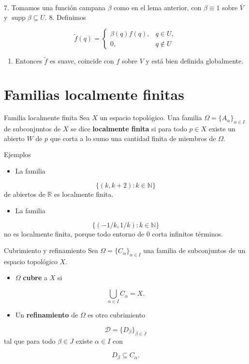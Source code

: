 \begin{bookproof}{}
7. Tomamos una función campana $\beta$ como en el lema anterior, con $\beta\equiv 1$ sobre $\overline V$ y $\operatorname{supp}\beta\subseteq U$. 8. Definimos

\[
\widetilde f(q)=\begin{cases}\beta(q)f(q),& q\in U,\\0,& q\notin U\end{cases}
\]
\begin{enumerate}[start=9]
\item Entonces $\widetilde f$ es suave, coincide con $f$ sobre $V$ y está bien definida globalmente.
\end{enumerate}
\bookqed
\end{bookproof}
\section{Familias localmente finitas}
\begin{bookdefinition}{Familia localmente finita}
Sea $X$ un espacio topológico. Una familia $\Omega=\{A_\alpha\}_{\alpha\in I}$ de subconjuntos de $X$ se dice \textbf{localmente finita} si para todo $p\in X$ existe un abierto $W$ de $p$ que corta a lo sumo una cantidad finita de miembros de $\Omega$.

\end{bookdefinition}
\begin{bookexample}{Ejemplos}
\begin{itemize}
\item La familia
\end{itemize}
\[
\bigl\{(k,k+2):k\in\mathbb N\bigr\}
\]
de abiertos de $\mathbb R$ es localmente finita.

\begin{itemize}
\item La familia
\end{itemize}
\[
\bigl\{(-1/k,1/k):k\in\mathbb N\bigr\}
\]
no es localmente finita, porque todo entorno de $0$ corta infinitos términos.

\end{bookexample}
\begin{bookdefinition}{Cubrimiento y refinamiento}
Sea $\Omega=\{C_\alpha\}_{\alpha\in I}$ una familia de subconjuntos de un espacio topológico $X$.

\begin{itemize}
\item $\Omega$ \textbf{cubre} a $X$ si
\end{itemize}
\[
\bigcup_{\alpha\in I} C_\alpha=X.
\]
\begin{itemize}
\item Un \textbf{refinamiento} de $\Omega$ es otro cubrimiento
\end{itemize}
\[
\mathcal D=\{D_\beta\}_{\beta\in J}
\]
tal que para todo $\beta\in J$ existe $\alpha\in I$ con

\[
D_\beta\subseteq C_\alpha.
\]
\end{bookdefinition}

